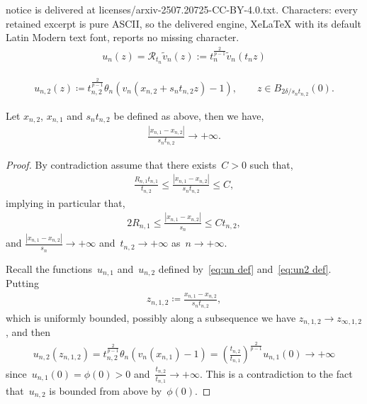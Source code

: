 \documentclass[10pt,a4paper]{amsart}
\newcommand{\parenthesis}[1]{\left(#1\right)} %
\renewcommand{\to}{\rightarrow}
\begin{document}
notice is delivered at licenses/arxiv-2507.20725-CC-BY-4.0.txt. Characters: every retained excerpt is pure ASCII, so the delivered engine, XeLaTeX with its default Latin Modern text font, reports no missing character.
            \begin{align}\label{eq:un def}
                u_n(z)= {\mathcal{R}}_{t_n}\tilde{v}_n(z):= t_n^{\frac{2}{p-1}}\tilde{v}_n(t_n z)
            \end{align}

    \begin{align}\label{eq:un2 def}
        u_{n,2}(z)\coloneqq t_{n,2}^{\frac{2}{p-1}} \theta_n \parenthesis{ v_n(x_{n,2}+ s_{n} t_{n,2} z)-1 }, \qquad z\in B_{{2\delta} / {s_n t_{n,2}}}(0).
    \end{align}

    \begin{lemma}\label{lemma:rel dist}
       Let $x_{n,2}$, $x_{n,1}$ and $s_n t_{n,2}$ be defined as above, then we have,
        \begin{align}\label{eq:far I}
            \frac{|x_{n,1}-x_{n,2}|}{s_n t_{n,2}}\to+\infty.
        \end{align}
    \end{lemma}

    \begin{proof}
        By contradiction assume that there exists~$C>0$ such that,
        \begin{align*}
            \frac{R_{n,1} t_{n,1}}{t_{n,2}}\leq \frac{|x_{n,1}-x_{n,2}|}{s_n t_{n,2}}\leq C,
        \end{align*}
        implying in particular that,
        \begin{align*}
          2R_{n,1}\leq \frac{|x_{n,1}-x_{n,2}|}{s_n} \leq C t_{n,2},
        \end{align*}
        and $\frac{|x_{n,1}-x_{n,2}|}{s_n}\to +\infty$ and~$t_{n,2}\to +\infty$ as~$n\to +\infty$.

        Recall the functions~$u_{n,1}$ and~$u_{n,2}$ defined by~\eqref{eq:un def} and~\eqref{eq:un2 def}.
        Putting
        \begin{align*}
            z_{n,1,2}\coloneqq \frac{x_{n,1} -x_{n,2}}{s_n t_{n,2}},
        \end{align*}
        which is uniformly bounded, possibly along a subsequence we have $z_{n,1, 2}\to z_{\infty,1,2}$, and then
        \begin{align*}
            u_{n,2}(z_{n,1,2})= t_{n,2}^{\frac{2}{p-1}}\theta_n\parenthesis{ v_n(x_{n,1} )-1}= \parenthesis{\frac{t_{n,2}}{t_{n,1}}}^{\frac{2}{p-1}} u_{n,1}(0)\to +\infty
        \end{align*}
        since~$u_{n,1}(0)=\phi(0)>0$ and~$\frac{t_{n,2}}{t_{n,1}}\to +\infty$.
        This is a contradiction to the fact that~$u_{n,2}$ is bounded from above by~$\phi(0)$.
    \end{proof}
\end{document}
